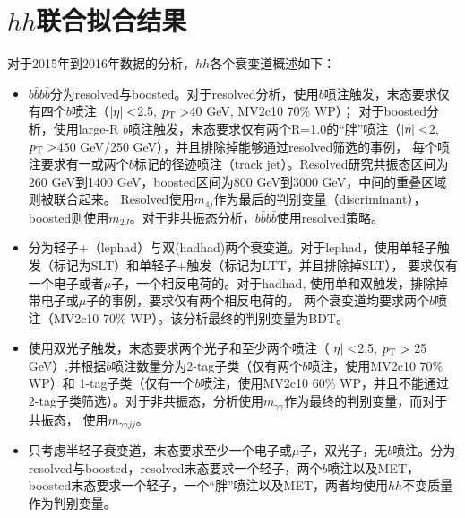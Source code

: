 \section{$hh$联合拟合结果}\label{sec:hh_comb}
对于2015年到2016年数据的分析，$hh$各个衰变道概述如下：
\begin{itemize}
 \item $b\bar{b}b\bar{b}$分为resolved与boosted。对于resolved分析，使用$b$喷注触发，末态要求仅有四个$b$喷注（$|\eta| <$2.5, $p_{\text{T}} >$40 GeV, MV2c10 70\% WP）；
 对于boosted分析，使用large-R $b$喷注触发，末态要求仅有两个R=1.0的“胖”喷注（$|\eta| <$2, $p_{\text{T}} >$450 GeV/250 GeV），并且排除掉能够通过resolved筛选的事例，
 每个喷注要求有一或两个$b$标记的径迹喷注（track jet）。Resolved研究共振态区间为260 GeV到1400 GeV，boosted区间为800 GeV到3000 GeV，中间的重叠区域则被联合起来。
 Resolved使用$m_{4j}$作为最后的判别变量（discriminant），boosted则使用$m_{2J}$。对于非共振态分析，$b\bar{b}b\bar{b}$使用resolved策略。
 
 \item \bbtt 分为轻子+\tauhad （lephad）与双\tauhad (hadhad)两个衰变道。对于lephad，使用单轻子触发（标记为SLT）和单轻子+\tauhad 触发（标记为LTT，并且排除掉SLT），
 要求仅有一个电子或者$\mu$子，一个相反电荷的\tauhad 。对于hadhad, 使用单\tauhad 和双\tauhad 触发，排除掉带电子或$\mu$子的事例，要求仅有两个相反电荷的\tauhad 。
 两个衰变道均要求两个$b$喷注（MV2c10 70\% WP）。该分析最终的判别变量为BDT。
 
 \item \bbaa 使用双光子触发，末态要求两个光子和至少两个喷注（$|\eta| <$2.5, $p_{\text{T}} >$ 25 GeV）,并根据$b$喷注数量分为2-tag子类（仅有两个$b$喷注，使用MV2c10 70\% WP）和
 1-tag子类（仅有一个$b$喷注，使用MV2c10 60\% WP，并且不能通过2-tag子类筛选）。对于非共振态，分析使用$m_{\gamma\gamma}$作为最终的判别变量，而对于共振态，
 使用$m_{\gamma\gamma jj}$。
 
 \item \wwaa 只考虑半轻子衰变道，末态要求至少一个电子或$\mu$子，双光子，无$b$喷注。\bbww 分为resolved与boosted，resolved末态要求一个轻子，两个$b$喷注以及MET，
 boosted末态要求一个轻子，一个“胖”喷注以及MET，两者均使用$hh$不变质量作为判别变量。
\end{itemize}

